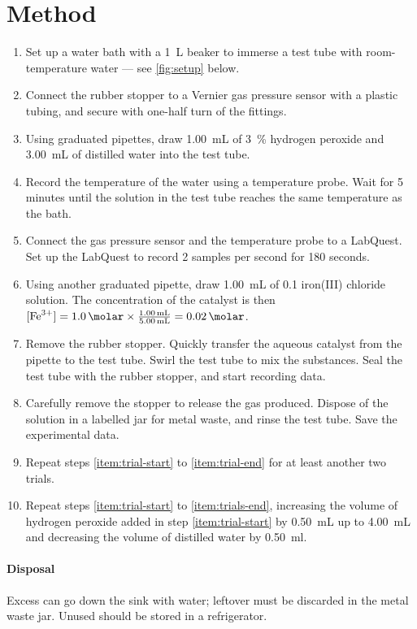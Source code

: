 \documentclass[a4paper, 12pt]{article}
\begin{document}
\section*{Method}
\begin{enumerate}
    \itemsep 0em
    \item Set up a water bath with a \SI{1}{\L} beaker to immerse a test tube with room-temperature water --- see \cref{fig:setup} below.
    \item Connect the rubber stopper to a Vernier gas pressure sensor with a plastic tubing, and secure with one-half turn of the fittings.
    \item \label{item:trial-start} Using graduated pipettes, draw \SI{1.00}{\mL} of \SI{3}{\%} hydrogen peroxide and \SI{3.00}{\mL} of distilled water into the test tube.
    \item Record the temperature of the water using a temperature probe. Wait for 5 minutes until the solution in the test tube reaches the same temperature as the bath.
    \item Connect the gas pressure sensor and the temperature probe to a LabQuest. Set up the LabQuest to record 2 samples per second for 180 seconds.
    \item Using another graduated pipette, draw \SI{1.00}{\mL} of \SI{0.1}{\molar} iron(III) chloride solution. The concentration of the catalyst is then $[\ce{Fe^3+}] = \SI{1.0}{\molar} \times \frac{ \SI{1.00}{\mL} }{ \SI{5.00}{\mL} } = \SI{0.02}{\molar}$.
    \item Remove the rubber stopper. Quickly transfer the aqueous catalyst from the pipette to the test tube. Swirl the test tube to mix the substances. Seal the test tube with the rubber stopper, and start recording data.
    \item \label{item:trial-end} Carefully remove the stopper to release the gas produced. Dispose of the solution in a labelled jar for metal waste, and rinse the test tube. Save the experimental data.
    \item \label{item:trials-end} Repeat steps \ref{item:trial-start} to \ref{item:trial-end} for at least another two trials.
    \item Repeat steps \ref{item:trial-start} to \ref{item:trials-end}, increasing the volume of hydrogen peroxide added in step \ref{item:trial-start} by \SI{0.50}{\mL} up to \SI{4.00}{\mL} and decreasing the volume of distilled water by \SI{0.50}{\ml}.
\end{enumerate}
\paragraph{Disposal} Excess  can go down the sink with water; leftover  must be discarded in the metal waste jar. Unused  should be stored in a refrigerator.
\end{document}
